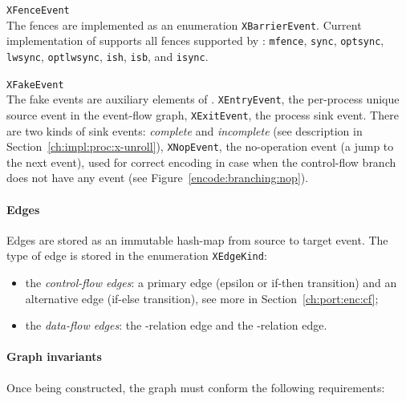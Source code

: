 \begin{outline}
  \1 \texttt{XFenceEvent} \\
    The fences are implemented as an enumeration \texttt{XBarrierEvent}.
    Current implementation of \porthos[2] supports all fences supported by \porthos[1]: 
    \texttt{mfence}, %
    \texttt{sync}, \texttt{optsync}, \texttt{lwsync}, \texttt{optlwsync}, \texttt{ish}, \texttt{isb}, and \texttt{isync}.%
    
  \1 \texttt{XFakeEvent} \\
    The fake events are auxiliary elements of \xgraph{}.
    \2 \texttt{XEntryEvent}, the per-process unique source event in the event-flow graph,
    \2 \texttt{XExitEvent}, the process sink event. There are two kinds of sink events: \textit{complete} and \textit{incomplete} (see description in Section~\ref{ch:impl:proc:x-unroll}),
    \2 \texttt{XNopEvent}, the no-operation event (a jump to the next event), used for correct encoding in case when the control-flow branch does not have any event (see Figure~\ref{encode:branching:nop}).
\end{outline}

\paragraph{Edges}
\label{ch:impl:model:xgraph:edges}
Edges are stored as an immutable hash-map from source to target event.
The type of edge is stored in the enumeration \texttt{XEdgeKind}:%
\begin{itemize}[noitemsep]
  \item the \textit{control-flow edges}: a primary edge (epsilon or if-then transition) and an alternative edge (if-else transition), see more in Section~\ref{ch:port:enc:cf};
  \item the \textit{data-flow edges}: the \co-relation edge and the \rf-relation edge. %
\end{itemize}


\paragraph{Graph invariants}
\label{ch:impl:model:xgraph:invariants}
Once being constructed, the graph must conform the following requirements:


